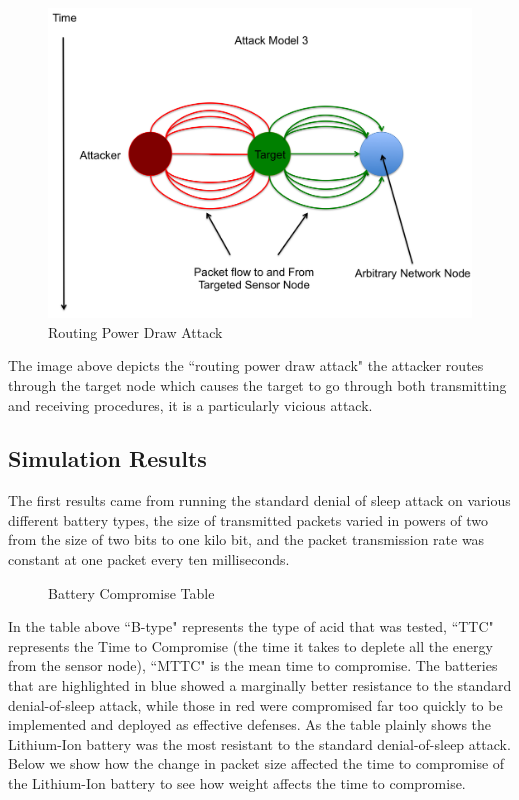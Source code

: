 \begin{figure}[H]
\caption{Routing Power Draw Attack}
\includegraphics[width = \linewidth]{Figures/AModel3.png}
\end{figure}

The image above depicts the ``routing power draw attack" the attacker routes through the target node which causes the target to go through both transmitting and receiving procedures, it is a particularly vicious attack.
\subsection{Simulation Results}

The first results came from running the standard denial of sleep attack on various different battery types, the size of transmitted packets varied in powers of two from the size of two bits to one kilo bit, and the packet transmission rate was constant at one packet every ten milliseconds.

\begin{figure}[H]
\caption{Battery Compromise Table} 

\end{figure}

In the table above ``B-type" represents the type of acid that was tested, ``TTC" represents the Time to Compromise (the time it takes to deplete all the energy from the sensor node), ``MTTC" is the mean time to compromise. The batteries that are highlighted in blue showed a marginally better resistance to the standard denial-of-sleep attack, while those in red were compromised far too quickly to be implemented and deployed as effective defenses. As the table plainly shows the Lithium-Ion battery was the most resistant to the standard denial-of-sleep attack. Below we show how the change in packet size affected the time to compromise of the Lithium-Ion battery to see how weight affects the time to compromise. 

